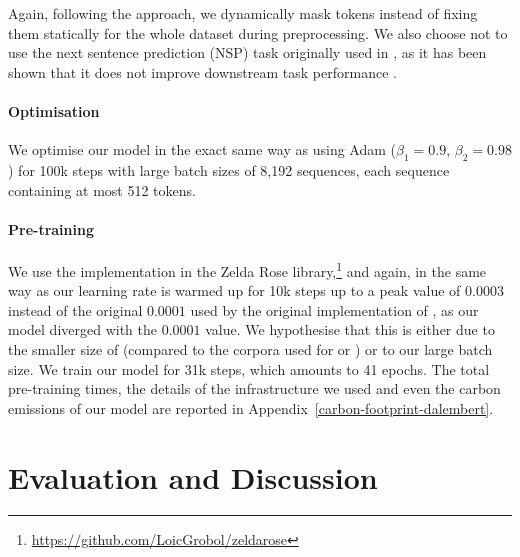 Again, following the \roberta approach, we dynamically mask tokens instead of fixing them statically for the whole dataset during preprocessing. We also choose not to use the next sentence prediction (NSP) task originally used in \bert \cite{devlin-etal-2019-bert}, as it has been shown that it does not improve downstream task performance \cite{conneau-lample-2019-cross,liu-etal-2019-roberta}.

\paragraph{Optimisation}
We optimise our model in the exact same way as \cite{liu-etal-2019-roberta} using Adam \cite{kingma-ba-2015-adam} ($\beta_1 = 0.9$, $\beta_2 = 0.98$) for 100k steps with large batch sizes of 8,192 sequences, each sequence containing at most 512 tokens.

\paragraph{Pre-training}
We use the \roberta implementation in the Zelda Rose library,\footnote{\url{https://github.com/LoicGrobol/zeldarose}} and again, in the same way as  our learning rate is warmed up for 10k steps up to a peak value of $0.0003$ instead of the original $0.0001$ used by the original implementation of \roberta \cite{liu-etal-2019-roberta}, as our model diverged with the $0.0001$ value. We hypothesise that this is either due to the smaller size of \freemmax (compared to the corpora used for \roberta or \camembert) or to our large batch size. We train our model for 31k steps, which amounts to 41 epochs. The total pre-training times, the details of the infrastructure we used and even the carbon emissions of our model are reported in Appendix~\ref{carbon-footprint-dalembert}.

\section{Evaluation and Discussion}

